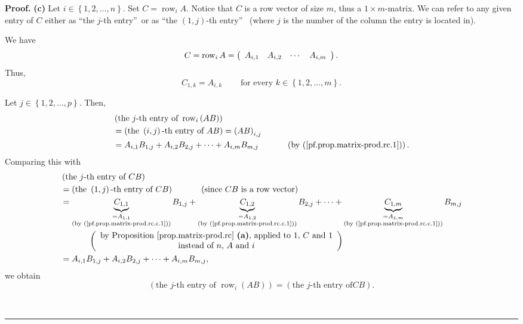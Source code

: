 \documentclass[numbers=enddot,12pt,final,onecolumn,notitlepage]{scrartcl}%
\theoremstyle{definition}
\newenvironment{proof}[1][Proof]{\noindent\textbf{#1.} }{\ \rule{0.5em}{0.5em}}
\begin{document}
\begin{proof}
\textbf{(c)} Let $i\in\left\{  1,2,\ldots,n\right\}  $. Set
$C=\operatorname*{row}\nolimits_{i}A$. Notice that $C$ is a row vector of size
$m$, thus a $1\times m$-matrix. We can refer to any given entry of $C$ either
as \textquotedblleft the $j$-th entry\textquotedblright\ or as
\textquotedblleft the $\left(  1,j\right)  $-th entry\textquotedblright%
\ (where $j$ is the number of the column the entry is located in).

We have%
\[
C=\operatorname*{row}\nolimits_{i}A=\left(
\begin{array}
[c]{cccc}%
A_{i,1} & A_{i,2} & \cdots & A_{i,m}%
\end{array}
\right)  .
\]
Thus,%
\begin{equation}
C_{1,k}=A_{i,k}\ \ \ \ \ \ \ \ \ \ \text{for every }k\in\left\{
1,2,\ldots,m\right\}  . \label{pf.prop.matrix-prod.rc.c.1}%
\end{equation}


Let $j\in\left\{  1,2,\ldots,p\right\}  $. Then,%
\begin{align*}
&  \left(  \text{the }j\text{-th entry of }\operatorname*{row}\nolimits_{i}%
\left(  AB\right)  \right) \\
&  =\left(  \text{the }\left(  i,j\right)  \text{-th entry of }AB\right)
=\left(  AB\right)  _{i,j}\\
&  =A_{i,1}B_{1,j}+A_{i,2}B_{2,j}+\cdots+A_{i,m}B_{m,j}%
\ \ \ \ \ \ \ \ \ \ \left(  \text{by (\ref{pf.prop.matrix-prod.rc.1})}\right)
.
\end{align*}
Comparing this with%
\begin{align*}
&  \left(  \text{the }j\text{-th entry of }CB\right) \\
&  =\left(  \text{the }\left(  1,j\right)  \text{-th entry of }CB\right)
\ \ \ \ \ \ \ \ \ \ \left(  \text{since }CB\text{ is a row vector}\right) \\
&  =\underbrace{C_{1,1}}_{\substack{=A_{1,1}\\\text{(by
(\ref{pf.prop.matrix-prod.rc.c.1}))}}}B_{1,j}+\underbrace{C_{1,2}%
}_{\substack{=A_{1,2}\\\text{(by (\ref{pf.prop.matrix-prod.rc.c.1}))}}%
}B_{2,j}+\cdots+\underbrace{C_{1,m}}_{\substack{=A_{1,m}\\\text{(by
(\ref{pf.prop.matrix-prod.rc.c.1}))}}}B_{m,j}\\
&  \ \ \ \ \ \ \ \ \ \ \left(
\begin{array}
[c]{c}%
\text{by Proposition \ref{prop.matrix-prod.rc} \textbf{(a)}, applied to
}1\text{, }C\text{ and }1\\
\text{instead of }n\text{, }A\text{ and }i
\end{array}
\right) \\
&  =A_{i,1}B_{1,j}+A_{i,2}B_{2,j}+\cdots+A_{i,m}B_{m,j},
\end{align*}
we obtain%
\begin{equation}
\left(  \text{the }j\text{-th entry of }\operatorname*{row}\nolimits_{i}%
\left(  AB\right)  \right)  =\left(  \text{the }j\text{-th entry of
}CB\right)  . \label{pf.prop.matrix-prod.rc.c.5}%
\end{equation}



\end{proof}
\end{document}
